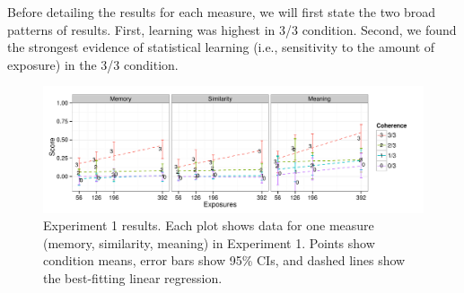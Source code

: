 \documentclass[man,floatsintext]{apa6}
\begin{document}
Before detailing the results for each measure, we will first state the
two broad patterns of results. First, learning was highest in 3/3
condition. Second, we found the strongest evidence of statistical
learning (i.e., sensitivity to the amount of exposure) in the 3/3
condition.


\begin{figure}[h]
  \begin{center}
    \includegraphics[width=1.0\linewidth]{x1.pdf}
    \caption{Experiment 1 results. Each plot shows data for one
measure (memory, similarity, meaning) in Experiment 1. Points show
condition means, error bars show 95\% CIs, and dashed lines show the
best-fitting linear regression.}
    \label{expt1-results}
  \end{center}
\end{figure}

\newcommand{\ww}{\color{white}{*}} \newcommand\T{\rule{0pt}{2.1ex}}
\end{document}
